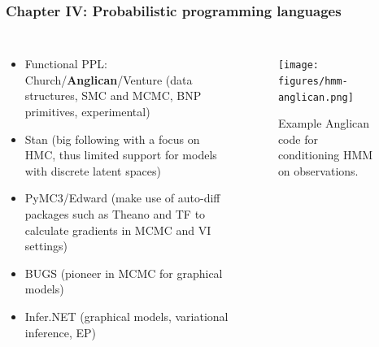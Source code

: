 \documentclass[aspectratio=169]{beamer}
\begin{document}

\begin{frame}
    \frametitle{Chapter IV: Probabilistic programming languages}
    \begin{columns}[c] 
        \begin{itemize}
            \item Functional PPL: Church/{\bf Anglican}/Venture (data structures, SMC and MCMC, BNP primitives, experimental)
            \item Stan (big following with a focus on HMC, thus limited support for models with discrete latent spaces)
            \item PyMC3/Edward (make use of auto-diff packages such as Theano and TF to calculate gradients in MCMC and
                VI settings)
            \item BUGS (pioneer in MCMC for graphical models)
            \item Infer.NET (graphical models, variational inference, EP)
        \end{itemize}

        \begin{figure}[ht!]
            \texttt{[image: figures/hmm-anglican.png]}
            \caption{Example Anglican code for conditioning HMM on observations.}
        \end{figure}
    \end{columns}
\end{frame}

\end{document}
